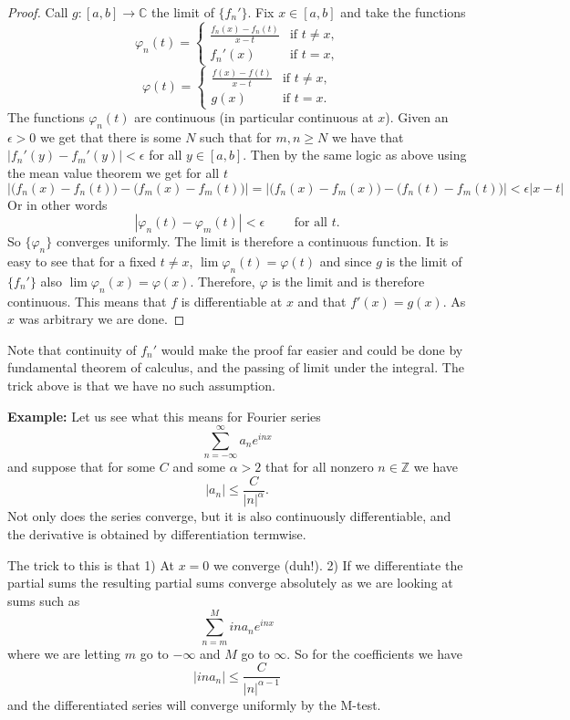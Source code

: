 \documentclass[12pt]{book}
\newcommand{\abs}[1]{\left\lvert {#1} \right\rvert}
\newcommand{\C}{{\mathbb{C}}}
\newcommand{\Z}{{\mathbb{Z}}}
\theoremstyle{plain}
\theoremstyle{remark}
\theoremstyle{definition}
\theoremstyle{exercise}
\theoremstyle{example}
\begin{document}
\begin{proof}
Call $g \colon [a,b] \to \C$ the limit of $\{ f_n' \}$. 
Fix $x \in [a,b]$ and take the functions
$$
\varphi_n(t) =
\begin{cases}
\frac{f_n(x)-f_n(t)}{x-t} & \text{if $t \not= x$,}\\
f_n'(x) & \text{if $t = x$,}
\end{cases}
$$
$$
\varphi(t) =
\begin{cases}
\frac{f(x)-f(t)}{x-t} & \text{if $t \not= x$,}\\
g(x) & \text{if $t = x$.}
\end{cases}
$$
The functions $\varphi_n(t)$ are continuous (in particular continuous at $x$).
Given an $\epsilon > 0$ we get that
there is some $N$ such that for $m,n \geq N$ we have that
$\abs{f_n'(y) - f_m'(y)} < \epsilon$ for all $y \in [a,b]$.
Then by the same logic as above
using the mean value theorem we get for all $t$
\begin{equation*}
\abs{\bigl(f_n(x)-f_n(t)\bigr) - \bigl(f_m(x)-f_m(t)\bigr)} = 
\abs{\bigl(f_n(x)-f_m(x)\bigr) - \bigl(f_n(t)-f_m(t)\bigr)}
<
\epsilon \abs{x-t}
\end{equation*}
Or in other words
$$
\abs{\varphi_n(t) - \varphi_m(t)} < \epsilon \qquad \text{ for all $t$}.
$$
So $\{ \varphi_n \}$ converges uniformly.  The limit is therefore
a continuous function.  It is easy to see that for a fixed $t \not= x$,
$\lim \varphi_n(t) = \varphi(t)$ and since $g$ is the limit of $\{ f_n' \}$
also $\lim \varphi_n(x) = \varphi(x)$.  Therefore, $\varphi$ is the limit
and is therefore continuous.  This means that $f$ is differentiable at $x$
and that $f'(x) = g(x)$.  As $x$ was arbitrary we are done.
\end{proof}

\medskip

Note that continuity of $f_n'$ would make the proof far easier and could be
done by fundamental theorem of calculus, and the passing of limit under the
integral.  The trick above is that we have no
such assumption.

\medskip

\textbf{Example:} Let us see what this means for Fourier series
$$
\sum_{n=-\infty}^\infty
a_n e^{inx}
$$
and suppose that for some $C$ and some $\alpha > 2$ that for all nonzero $n \in \Z$ we have
$$
\abs{a_n} \leq \frac{C}{\abs{n}^\alpha} .
$$
Not only does the series converge, but it is also
continuously differentiable, and the derivative is obtained by 
differentiation termwise.

The trick to this is that 1) At $x=0$ we converge (duh!).  2) If we
differentiate the partial sums the resulting partial sums converge
absolutely as we are looking at sums such as
$$
\sum_{n=m}^{M}
i n a_n e^{inx}
$$
where we are letting $m$ go to $-\infty$ and $M$ go to $\infty$.
So for the coefficients we have $$\abs{ina_n} \leq \frac{C}{\abs{n}^{\alpha-1}}$$ and
the differentiated series will converge uniformly by the M-test.
\end{document}
